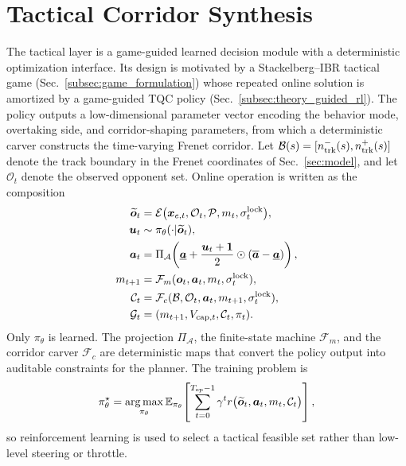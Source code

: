 \documentclass{iopjournal}
\begin{document}
\section{Tactical Corridor Synthesis}\label{sec:tactical}
The tactical layer is a game-guided learned decision module with a
deterministic optimization interface.  Its design is motivated by a
Stackelberg--IBR tactical game
(Sec.~\ref{subsec:game_formulation}) whose repeated online solution is
amortized by a game-guided TQC policy
(Sec.~\ref{subsec:theory_guided_rl}).  The policy outputs a
low-dimensional parameter vector encoding the behavior mode, overtaking side,
and corridor-shaping parameters, from which a deterministic carver constructs
the time-varying Frenet corridor.
Let $\mathcal{B}(s)=[n_{\rm trk}^-(s),n_{\rm trk}^+(s)]$
denote the track boundary in the Frenet coordinates of Sec.~\ref{sec:model},
and let $\mathcal{O}_t$ denote the observed opponent set.  Online operation is
written as the composition
\begin{equation}
\begin{aligned}
\widetilde{\bm{o}}_t
&=\mathcal{E}\bigl(\bm{x}_{e,t},\mathcal{O}_t,\mathcal{P},
m_t,\sigma_t^{\rm lock}\bigr),\\
\bm{u}_t&\sim\pi_\theta(\cdot|\widetilde{\bm{o}}_t),\\
\bm{a}_t&=\Pi_{\mathcal{A}}\!\left(
\underline{\bm{a}}+\frac{\bm{u}_t+\bm{1}}{2}\odot
(\overline{\bm{a}}-\underline{\bm{a}})\right),\\
m_{t+1}&=\mathcal{F}_{m}(\bm{o}_t,\bm{a}_t,m_t,\sigma_t^{\rm lock}),\\
\mathcal{C}_t&=\mathcal{F}_{c}(\mathcal{B},\mathcal{O}_t,\bm{a}_t,
m_{t+1},\sigma_t^{\rm lock}),\\
\mathcal{G}_t&=(m_{t+1},V_{{\rm cap},t},\mathcal{C}_t,\pi_t).
\end{aligned}
\label{eq:tactical_stack}
\end{equation}
Only $\pi_\theta$ is learned.  The projection $\Pi_{\mathcal A}$, the
finite-state machine $\mathcal{F}_m$, and the corridor carver
$\mathcal{F}_c$ are deterministic maps that convert the policy output into
auditable constraints for the planner.  The training problem is
\begin{equation}
\pi_\theta^\star=
\operatorname*{arg\,max}_{\pi_\theta}
\mathbb{E}_{\pi_\theta}\!
\left[
\sum_{t=0}^{T_{\rm ep}-1}\gamma^t
r\bigl(\widetilde{\bm{o}}_t,\bm{a}_t,m_t,\mathcal{C}_t\bigr)
\right],
\label{eq:tactical_objective}
\end{equation}
so reinforcement learning is used to select a tactical feasible set rather
than low-level steering or throttle.
\end{document}
